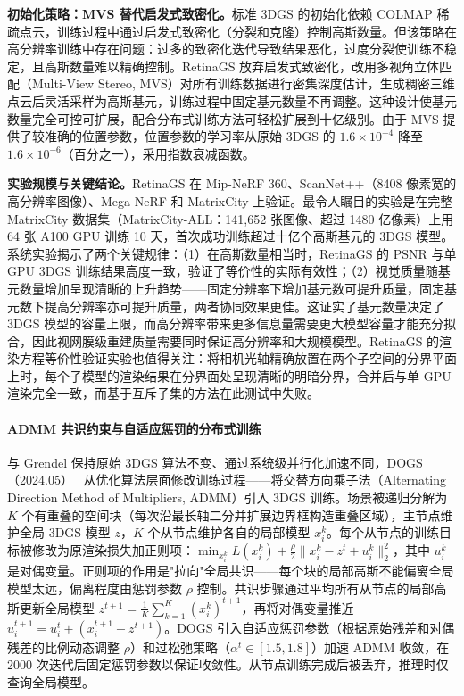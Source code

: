 \textbf{初始化策略：MVS 替代启发式致密化。}标准 3DGS 的初始化依赖 COLMAP 稀疏点云，训练过程中通过启发式致密化（分裂和克隆）控制高斯数量。但该策略在高分辨率训练中存在问题：过多的致密化迭代导致结果恶化，过度分裂使训练不稳定，且高斯数量难以精确控制。RetinaGS 放弃启发式致密化，改用多视角立体匹配（Multi-View Stereo, MVS）对所有训练数据进行密集深度估计，生成稠密三维点云后灵活采样为高斯基元，训练过程中固定基元数量不再调整。这种设计使基元数量完全可控可扩展，配合分布式训练方法可轻松扩展到十亿级别。由于 MVS 提供了较准确的位置参数，位置参数的学习率从原始 3DGS 的 $1.6 \times 10^{-4}$ 降至 $1.6 \times 10^{-6}$（百分之一），采用指数衰减函数。

\textbf{实验规模与关键结论。}RetinaGS 在 Mip-NeRF 360、ScanNet++（8408 像素宽的高分辨率图像）、Mega-NeRF 和 MatrixCity 上验证。最令人瞩目的实验是在完整 MatrixCity 数据集（MatrixCity-ALL：141{,}652 张图像、超过 1480 亿像素）上用 64 张 A100 GPU 训练 10 天，首次成功训练超过十亿个高斯基元的 3DGS 模型。系统实验揭示了两个关键规律：（1）在高斯数量相当时，RetinaGS 的 PSNR 与单 GPU 3DGS 训练结果高度一致，验证了等价性的实际有效性；（2）视觉质量随基元数量增加呈现清晰的上升趋势——固定分辨率下增加基元数可提升质量，固定基元数下提高分辨率亦可提升质量，两者协同效果更佳。这证实了基元数量决定了 3DGS 模型的容量上限，而高分辨率带来更多信息量需要更大模型容量才能充分拟合，因此视网膜级重建质量需要同时保证高分辨率和大规模模型。RetinaGS 的渲染方程等价性验证实验也值得关注：将相机光轴精确放置在两个子空间的分界平面上时，每个子模型的渲染结果在分界面处呈现清晰的明暗分界，合并后与单 GPU 渲染完全一致，而基于互斥子集的方法在此测试中失败。

\paragraph{ADMM 共识约束与自适应惩罚的分布式训练}

与 Grendel 保持原始 3DGS 算法不变、通过系统级并行化加速不同，DOGS（2024.05）~\cite{2405_13943} 从优化算法层面修改训练过程——将交替方向乘子法（Alternating Direction Method of Multipliers, ADMM）引入 3DGS 训练。场景被递归分解为 $K$ 个有重叠的空间块（每次沿最长轴二分并扩展边界框构造重叠区域），主节点维护全局 3DGS 模型 $z$，$K$ 个从节点维护各自的局部模型 $x_i^k$。每个从节点的训练目标被修改为原渲染损失加正则项：$\min_{x_i^k} L(x_i^k) + \frac{\rho}{2}\|x_i^k - z^t + u_i^k\|_2^2$，其中 $u_i^k$ 是对偶变量。正则项的作用是"拉向"全局共识——每个块的局部高斯不能偏离全局模型太远，偏离程度由惩罚参数 $\rho$ 控制。共识步骤通过平均所有从节点的局部高斯更新全局模型 $z^{t+1} = \frac{1}{K}\sum_{k=1}^{K}(x_i^k)^{t+1}$，再将对偶变量推近 $u_i^{t+1} = u_i^t + (x_i^{t+1} - z^{t+1})$。DOGS 引入自适应惩罚参数（根据原始残差和对偶残差的比例动态调整 $\rho$）和过松弛策略（$\alpha^t \in [1.5, 1.8]$）加速 ADMM 收敛，在 2000 次迭代后固定惩罚参数以保证收敛性。从节点训练完成后被丢弃，推理时仅查询全局模型。


